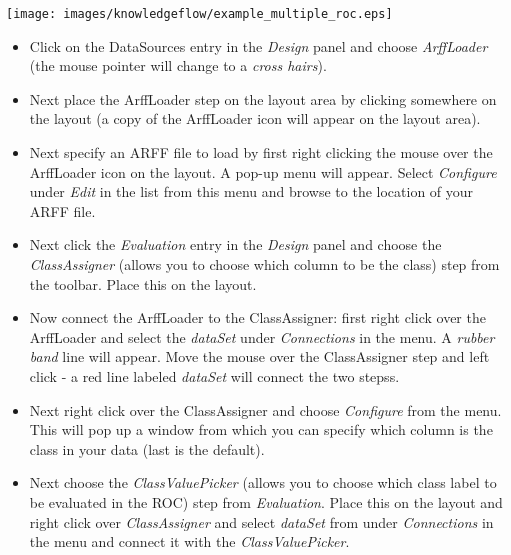 \begin{center}
  \texttt{[image: images/knowledgeflow/example\_multiple\_roc.eps]}
\end{center}

\begin{itemize}
	\item Click on the DataSources entry in the \textit{Design}
          panel and choose \textit{ArffLoader} (the mouse pointer will
          change to a \textit{cross hairs}).

	\item Next place the ArffLoader step on the layout area by clicking
	somewhere on the layout (a copy of the ArffLoader icon will appear on
	the layout area).

	\item Next specify an ARFF file to load by first right clicking the mouse
	over the ArffLoader icon on the layout. A pop-up menu will
	appear. Select \textit{Configure} under \textit{Edit} in the list from this menu and
	browse to the location of your ARFF file.

	\item Next click the \textit{Evaluation} entry in the
          \textit{Design} panel and choose the \textit{ClassAssigner}
          (allows you to choose which column to be the class)
          step from the toolbar. Place this on the layout.

	\item Now connect the ArffLoader to the ClassAssigner: first right click
	over the ArffLoader and select the \textit{dataSet} under \textit{Connections} in
	the menu. A \textit{rubber band} line will appear. Move the mouse over the
	ClassAssigner step and left click - a red line labeled \textit{dataSet}
	will connect the two stepss.

	\item Next right click over the ClassAssigner and choose \textit{Configure} from
	the menu. This will pop up a window from which you can specify which
	column is the class in your data (last is the default).

	\item Next choose the \textit{ClassValuePicker} (allows you to
          choose which class label to be evaluated in the ROC)
          step from \textit{Evaluation}. Place this on
          the layout and right click over \textit{ClassAssigner} and
          select \textit{dataSet} from under \textit{Connections} in
          the menu and connect it with the \textit{ClassValuePicker}.


\end{itemize}
